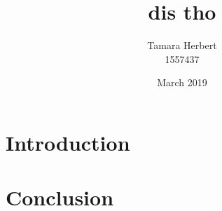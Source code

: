 \documentclass{article}
\title{dis tho}
\author{Tamara Herbert \\ 1557437}
\date{March 2019}
\begin{document}
\maketitle

\tableofcontents

\pagebreak

\section{Introduction}


\section{Conclusion}




\end{document}
